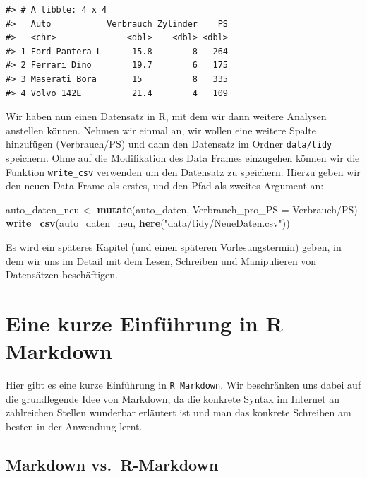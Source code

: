 \documentclass[]{tufte-book}
\newenvironment{Shaded}{}{}
\newcommand{\KeywordTok}[1]{\textcolor[rgb]{0.00,0.44,0.13}{\textbf{#1}}}
\newcommand{\DataTypeTok}[1]{\textcolor[rgb]{0.56,0.13,0.00}{#1}}
\newcommand{\StringTok}[1]{\textcolor[rgb]{0.25,0.44,0.63}{#1}}
\newcommand{\OperatorTok}[1]{\textcolor[rgb]{0.40,0.40,0.40}{#1}}
\newcommand{\NormalTok}[1]{#1}
\begin{document}
\begin{verbatim}
#> # A tibble: 4 x 4
#>   Auto           Verbrauch Zylinder    PS
#>   <chr>              <dbl>    <dbl> <dbl>
#> 1 Ford Pantera L      15.8        8   264
#> 2 Ferrari Dino        19.7        6   175
#> 3 Maserati Bora       15          8   335
#> 4 Volvo 142E          21.4        4   109
\end{verbatim}

Wir haben nun einen Datensatz in R, mit dem wir dann weitere Analysen
anstellen können. Nehmen wir einmal an, wir wollen eine weitere Spalte
hinzufügen (Verbrauch/PS) und dann den Datensatz im Ordner
\texttt{data/tidy} speichern. Ohne auf die Modifikation des Data Frames
einzugehen können wir die Funktion \texttt{write\_csv} verwenden um den
Datensatz zu speichern. Hierzu geben wir den neuen Data Frame als
erstes, und den Pfad als zweites Argument an:

\begin{Shaded}
\begin{Highlighting}[]
\NormalTok{auto_daten_neu <-}\StringTok{ }\KeywordTok{mutate}\NormalTok{(auto_daten, }\DataTypeTok{Verbrauch_pro_PS =}\NormalTok{ Verbrauch}\OperatorTok{/}\NormalTok{PS)}
\KeywordTok{write_csv}\NormalTok{(auto_daten_neu, }\KeywordTok{here}\NormalTok{(}\StringTok{"data/tidy/NeueDaten.csv"}\NormalTok{))}
\end{Highlighting}
\end{Shaded}

Es wird ein späteres Kapitel (und einen späteren Vorlesungstermin)
geben, in dem wir uns im Detail mit dem Lesen, Schreiben und
Manipulieren von Datensätzen beschäftigen.

\appendix


\chapter{Eine kurze Einführung in R Markdown}\label{markdown}

Hier gibt es eine kurze Einführung in \texttt{R\ Markdown}. Wir
beschränken uns dabei auf die grundlegende Idee von Markdown, da die
konkrete Syntax im Internet an zahlreichen Stellen wunderbar erläutert
ist und man das konkrete Schreiben am besten in der Anwendung lernt.

\section{Markdown vs.~R-Markdown}\label{markdown-vs.r-markdown}
\end{document}
